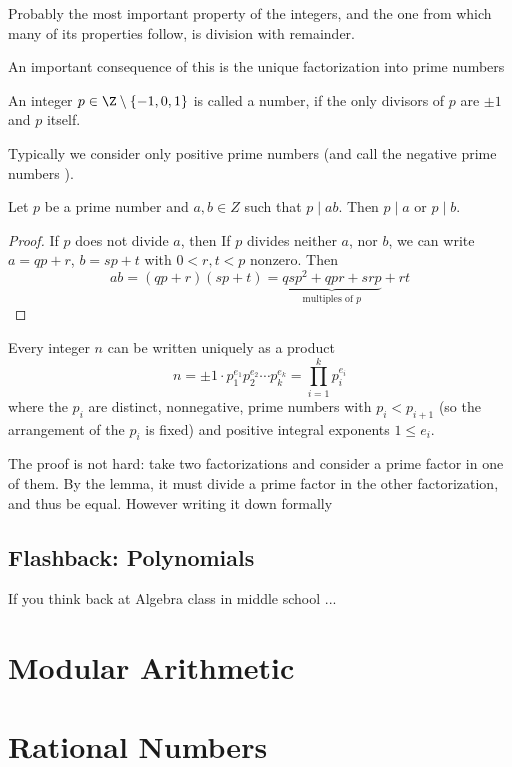 Probably the most important property of the integers, and the one from which
many of its properties follow, is division with remainder. 

An important  consequence of this is the unique factorization into prime numbers

\begin{defn}
An integer $p\in\Z\setminus\{-1,0,1\}$ is called a  number, if
the only divisors of $p$ are $\pm 1$ and $p$ itself.
\end{defn}
Typically we consider only positive prime numbers (and call the negative
prime numbers ).
\begin{lemma}
Let $p$ be a prime number and $a,b\in Z$ such that $p\mid ab$. Then $p\mid
a$ or $p\mid b$.
\end{lemma}
\begin{proof}
If $p$ does not divide $a$, then
If $p$ divides neither $a$, nor $b$, we can write $a=qp+r$, $b=sp+t$ with
$0<r,t<p$ nonzero. Then
\[
ab=(qp+r)(sp+t)=\underbrace{qsp^2+qpr+srp}_{\mbox{multiples of $p$}}+rt
\]
\end{proof}
\begin{cor}
Every integer $n$ can be written uniquely as a product
\[
n=\pm1\cdot p_1^{e_1}p_2^{e_2}\cdots p_k^{e_k}=\prod_{i=1}^k p_i^{e_i}
\]
where the $p_i$ are distinct, nonnegative, prime numbers with $p_i<p_{i+1}$
(so the arrangement of the $p_i$ is fixed) and positive integral exponents
$1\le e_i$.
\end{cor}
The proof is not hard: take two factorizations and consider a prime factor
in one of them. By the lemma, it must divide a prime factor in the other
factorization, and thus be equal. However writing it down formally 



\subsection{Flashback: Polynomials}
\bonussection

If you think back at Algebra class in middle school ...

\section{Modular Arithmetic}

\section{Rational Numbers}

